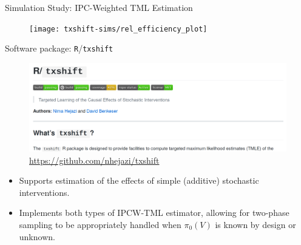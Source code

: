 \documentclass{beamer}
\begin{document}

\begin{frame}[c]{Simulation Study: IPC-Weighted TML Estimation}

\vspace{-0.45em}
\begin{figure}\label{fig:txshift-efficiency}
  \centering
  \texttt{[image: txshift-sims/rel\_efficiency\_plot]}
\end{figure}

\note{
}

\end{frame}


\begin{frame}[c]{Software package: \texttt{R}/\texttt{txshift}}

\begin{figure}[H]
  \centering
  \includegraphics[width=\textwidth]{txshift}
  \caption{
    \url{https://github.com/nhejazi/txshift}
  }
\end{figure}

\vspace{-2em}

\begin{center}
\begin{itemize}
  \itemsep4pt
  \item Supports estimation of the effects of simple (additive) stochastic
    interventions.
  \item Implements both types of IPCW-TML estimator, allowing for two-phase
    sampling to be appropriately handled when $\pi_0(V)$ is known by design or
    unknown.
\end{itemize}
\end{center}


\end{frame}
\end{document}
